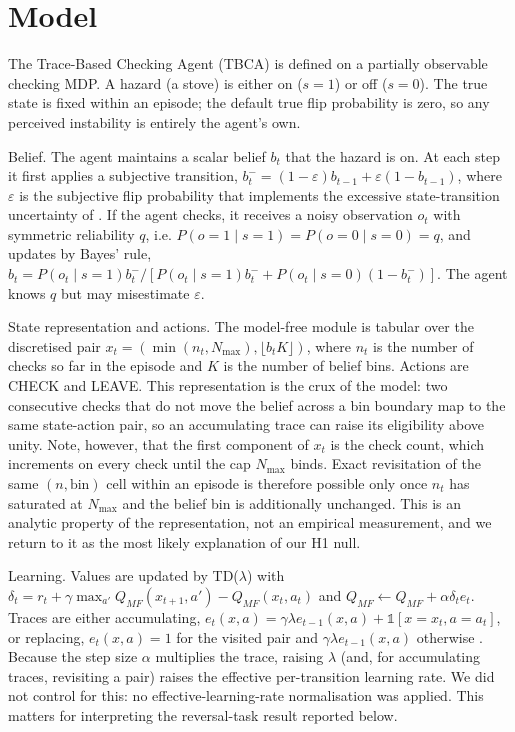 \documentclass[11pt,a4paper]{article}
\begin{document}
\section{Model}
The Trace-Based Checking Agent (TBCA) is defined on a partially observable checking MDP. A hazard (a stove) is either on ($s=1$) or off ($s=0$). The true state is fixed within an episode; the default true flip probability is zero, so any perceived instability is entirely the agent's own.

Belief. The agent maintains a scalar belief $b_t$ that the hazard is on. At each step it first applies a subjective transition, $b_t^{-} = (1-\varepsilon) b_{t-1} + \varepsilon (1-b_{t-1})$, where $\varepsilon$ is the subjective flip probability that implements the excessive state-transition uncertainty of \citet{fradkin2020searching}. If the agent checks, it receives a noisy observation $o_t$ with symmetric reliability $q$, i.e. $P(o=1\mid s=1) = P(o=0\mid s=0) = q$, and updates by Bayes' rule, $b_t = P(o_t\mid s=1) b_t^{-} / [P(o_t\mid s=1) b_t^{-} + P(o_t\mid s=0)(1-b_t^{-})]$. The agent knows $q$ but may misestimate $\varepsilon$.

State representation and actions. The model-free module is tabular over the discretised pair $x_t = (\min(n_t, N_{\max}), \lfloor b_t K \rfloor)$, where $n_t$ is the number of checks so far in the episode and $K$ is the number of belief bins. Actions are CHECK and LEAVE. This representation is the crux of the model: two consecutive checks that do not move the belief across a bin boundary map to the same state-action pair, so an accumulating trace can raise its eligibility above unity. Note, however, that the first component of $x_t$ is the check count, which increments on every check until the cap $N_{\max}$ binds. Exact revisitation of the same $(n, \text{bin})$ cell within an episode is therefore possible only once $n_t$ has saturated at $N_{\max}$ and the belief bin is additionally unchanged. This is an analytic property of the representation, not an empirical measurement, and we return to it as the most likely explanation of our H1 null.

Learning. Values are updated by TD($\lambda$) with $\delta_t = r_t + \gamma \max_{a'} Q_{MF}(x_{t+1},a') - Q_{MF}(x_t,a_t)$ and $Q_{MF} \leftarrow Q_{MF} + \alpha \delta_t e_t$. Traces are either accumulating, $e_t(x,a) = \gamma\lambda e_{t-1}(x,a) + \mathbb{1}[x=x_t, a=a_t]$, or replacing, $e_t(x,a) = 1$ for the visited pair and $\gamma\lambda e_{t-1}(x,a)$ otherwise \citep{singh1996reinforcement}. Because the step size $\alpha$ multiplies the trace, raising $\lambda$ (and, for accumulating traces, revisiting a pair) raises the effective per-transition learning rate. We did not control for this: no effective-learning-rate normalisation was applied. This matters for interpreting the reversal-task result reported below.
\end{document}
